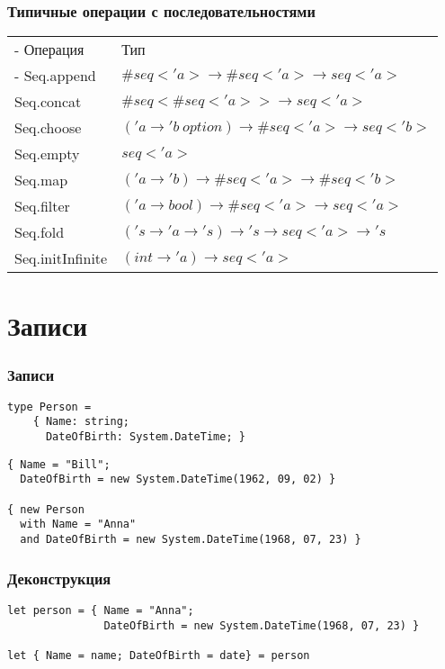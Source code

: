 \documentclass[xetex,mathserif,serif]{beamer}
\begin{document}
	\begin{frame}
		\frametitle{Типичные операции с последовательностями}
		\begin{small}
			\begin{tabu} {| X[0.5 l p] | X[1 l p] |}
				\tabucline-
				Операция                               & Тип                    \\
				\tabucline-
				\everyrow{\tabucline-}
				Seq.append                    & $\#seq<'a> \to \#seq<'a> \to seq<'a>$ \\
				Seq.concat                    & $\#seq<\#seq<'a>> \to seq<'a>$ \\
				Seq.choose                    & $('a \to 'b\ option) \to \#seq<'a> \to seq<'b>$ \\
				Seq.empty                     & $seq<'a>$ \\
				Seq.map                       & $('a \to 'b) \to \#seq<'a> \to \#seq<'b>$ \\
				Seq.filter                    & $('a \to bool) \to \#seq<'a> \to seq<'a>$ \\
				Seq.fold                      & $('s \to 'a \to 's) \to 's \to seq<'a> \to 's$ \\
				Seq.initInfinite              & $(int \to 'a) \to seq<'a>$ \\
			\end{tabu}
		\end{small}
	\end{frame}

	\section{Записи}
	
	\begin{frame}[fragile]
		\frametitle{Записи}
		\begin{verbatim}
type Person =
    { Name: string;
      DateOfBirth: System.DateTime; }
		\end{verbatim}

		\begin{verbatim}
{ Name = "Bill"; 
  DateOfBirth = new System.DateTime(1962, 09, 02) }

{ new Person
  with Name = "Anna"
  and DateOfBirth = new System.DateTime(1968, 07, 23) }
		\end{verbatim}
	\end{frame}

	\begin{frame}[fragile]
		\frametitle{Деконструкция}
		\begin{verbatim}
let person = { Name = "Anna"; 
               DateOfBirth = new System.DateTime(1968, 07, 23) }

let { Name = name; DateOfBirth = date} = person
		\end{verbatim}
	\end{frame}
\end{document}
